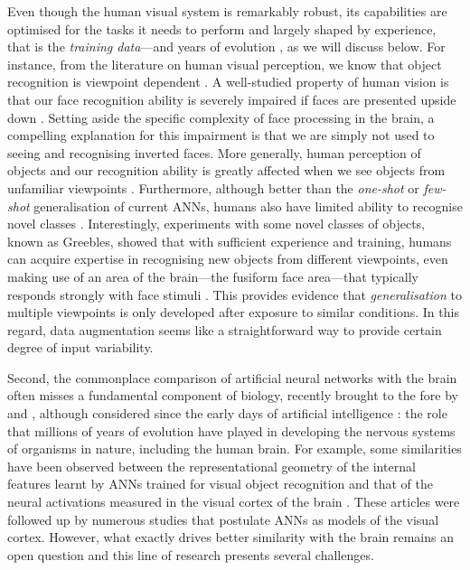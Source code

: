 {Even though the human visual system is remarkably robust, its capabilities are optimised for the tasks it needs to perform and largely shaped by experience, that is the \textit{training data}---and years of evolution \citep{hasson2020directfit}, as we will discuss below. For instance, from the literature on human visual perception, we know that object recognition is viewpoint dependent \citep{tarr1998viewpointdependence}. A well-studied property of human vision is that our face recognition ability is severely impaired if faces are presented upside down \citep{yin1969invertedfaces, valentine1988invertedfaces}. Setting aside the specific complexity of face processing in the brain, a compelling explanation for this impairment is that we are simply not used to seeing and recognising inverted faces. More generally, human perception of objects and our recognition ability is greatly affected when we see objects from unfamiliar viewpoints \citep{edelman1992viewpointdependence, tarr1998viewpointdependence, bulthoff2006viewpointdependence, milivojevic2012viewpointdependence}. Furthermore, although better than the \textit{one-shot} or \textit{few-shot} generalisation of current ANNs, humans also have limited ability to recognise novel classes \citep{morgenstern2019oneshot}. Interestingly, experiments with some novel classes of objects, known as Greebles, showed that with sufficient experience and training, humans can acquire expertise in recognising new objects from different viewpoints, even making use of an area of the brain---the fusiform face area---that typically responds strongly with face stimuli \citep{gauthier1999greebles}. This provides evidence that \textit{generalisation} to multiple viewpoints is only developed after exposure to similar conditions. In this regard, data augmentation seems like a straightforward way to provide certain degree of input variability.

Second, the commonplace comparison of artificial neural networks with the brain often misses a fundamental component of biology, recently brought to the fore by \citet{zador2019purelearning} and \citet{hasson2020directfit}, although considered since the early days of artificial intelligence \citep{turing1948intelligentmachinery}: the role that millions of years of evolution have played in developing the nervous systems of organisms in nature, including the human brain. For example, some similarities have been observed between the representational geometry of the internal features learnt by ANNs trained for visual object recognition and that of the neural activations measured in the visual cortex of the brain \citep{yamins2014annsbrains, khaligh2014annbrains, gucclu2015annbrains}. These articles were followed up by numerous studies that postulate ANNs as models of the visual cortex. However, what exactly drives better similarity with the brain remains an open question and this line of research presents several challenges. 

}
